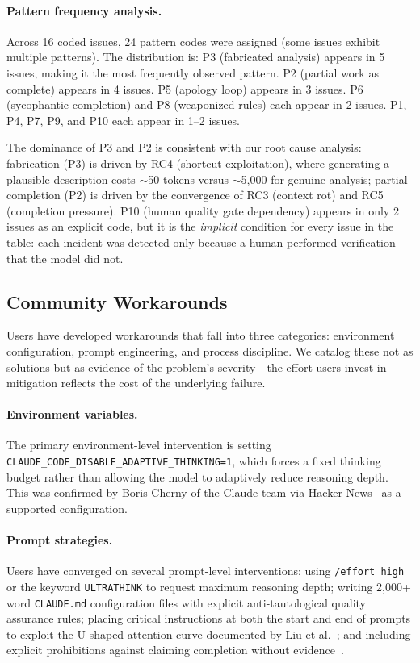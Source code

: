 \paragraph{Pattern frequency analysis.}
Across 16 coded issues, 24 pattern codes were assigned (some issues exhibit multiple patterns).
The distribution is:
P3 (fabricated analysis) appears in 5 issues, making it the most frequently observed pattern.
P2 (partial work as complete) appears in 4 issues.
P5 (apology loop) appears in 3 issues.
P6 (sycophantic completion) and P8 (weaponized rules) each appear in 2 issues.
P1, P4, P7, P9, and P10 each appear in 1--2 issues.

The dominance of P3 and P2 is consistent with our root cause analysis: fabrication (P3) is driven by RC4 (shortcut exploitation), where generating a plausible description costs $\sim$50 tokens versus $\sim$5{,}000 for genuine analysis; partial completion (P2) is driven by the convergence of RC3 (context rot) and RC5 (completion pressure).
P10 (human quality gate dependency) appears in only 2 issues as an explicit code, but it is the \emph{implicit} condition for every issue in the table: each incident was detected only because a human performed verification that the model did not.


\subsection{Community Workarounds}
\label{sec:workarounds}

Users have developed workarounds that fall into three categories: environment configuration, prompt engineering, and process discipline.
We catalog these not as solutions but as evidence of the problem's severity---the effort users invest in mitigation reflects the cost of the underlying failure.

\paragraph{Environment variables.}
The primary environment-level intervention is setting \texttt{CLAUDE\_CODE\_DISABLE\_ADAPTIVE\_THINKING=1}, which forces a fixed thinking budget rather than allowing the model to adaptively reduce reasoning depth.
This was confirmed by Boris Cherny of the Claude team via Hacker News~\cite{hn2026claudeissue} as a supported configuration.

\paragraph{Prompt strategies.}
Users have converged on several prompt-level interventions: using \texttt{/effort high} or the keyword \texttt{ULTRATHINK} to request maximum reasoning depth; writing 2{,}000+ word \texttt{CLAUDE.md} configuration files with explicit anti-tautological quality assurance rules; placing critical instructions at both the start and end of prompts to exploit the U-shaped attention curve documented by Liu et al.~\cite{liu2023lost}; and including explicit prohibitions against claiming completion without evidence~\cite{dolthub2025gotchas,ghissue36241}.


